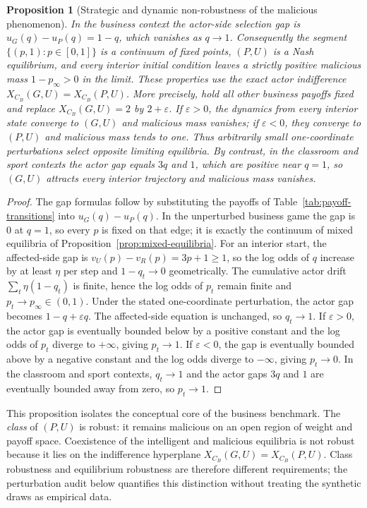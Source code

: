 \documentclass[a4paper,fleqn]{cas-dc}
\newtheorem{proposition}[definition]{Proposition}
\theoremstyle{remark}
\begin{document}
\begin{proposition}[Strategic and dynamic non-robustness of the malicious phenomenon]
\label{prop:knife-edge}
In the business context the actor-side selection gap is $u_G(q)-u_P(q)=1-q$, which vanishes as $q\to1$. Consequently the segment $\{(p,1):p\in[0,1]\}$ is a continuum of fixed points, $(P,U)$ is a Nash equilibrium, and every interior initial condition leaves a strictly positive malicious mass $1-p_\infty>0$ in the limit. These properties use the exact actor indifference $X_{C_B}(G,U)=X_{C_B}(P,U)$. More precisely, hold all other business payoffs fixed and replace $X_{C_B}(G,U)=2$ by $2+\varepsilon$. If $\varepsilon>0$, the dynamics from every interior state converge to $(G,U)$ and malicious mass vanishes; if $\varepsilon<0$, they converge to $(P,U)$ and malicious mass tends to one. Thus arbitrarily small one-coordinate perturbations select opposite limiting equilibria. By contrast, in the classroom and sport contexts the actor gap equals $3q$ and $1$, which are positive near $q=1$, so $(G,U)$ attracts every interior trajectory and malicious mass vanishes.
\end{proposition}

\begin{proof}
The gap formulas follow by substituting the payoffs of Table~\ref{tab:payoff-transitions} into $u_G(q)-u_P(q)$. In the unperturbed business game the gap is $0$ at $q=1$, so every $p$ is fixed on that edge; it is exactly the continuum of mixed equilibria of Proposition~\ref{prop:mixed-equilibria}. For an interior start, the affected-side gap is $v_U(p)-v_R(p)=3p+1\ge1$, so the log odds of $q$ increase by at least $\eta$ per step and $1-q_t\to0$ geometrically. The cumulative actor drift $\sum_t\eta(1-q_t)$ is finite, hence the log odds of $p_t$ remain finite and $p_t\to p_\infty\in(0,1)$. Under the stated one-coordinate perturbation, the actor gap becomes $1-q+\varepsilon q$. The affected-side equation is unchanged, so $q_t\to1$. If $\varepsilon>0$, the actor gap is eventually bounded below by a positive constant and the log odds of $p_t$ diverge to $+\infty$, giving $p_t\to1$. If $\varepsilon<0$, the gap is eventually bounded above by a negative constant and the log odds diverge to $-\infty$, giving $p_t\to0$. In the classroom and sport contexts, $q_t\to1$ and the actor gaps $3q$ and $1$ are eventually bounded away from zero, so $p_t\to1$.
\end{proof}

This proposition isolates the conceptual core of the business benchmark. The \emph{class} of $(P,U)$ is robust: it remains malicious on an open region of weight and payoff space. Coexistence of the intelligent and malicious equilibria is not robust because it lies on the indifference hyperplane $X_{C_B}(G,U)=X_{C_B}(P,U)$. Class robustness and equilibrium robustness are therefore different requirements; the perturbation audit below quantifies this distinction without treating the synthetic draws as empirical data.
\end{document}
